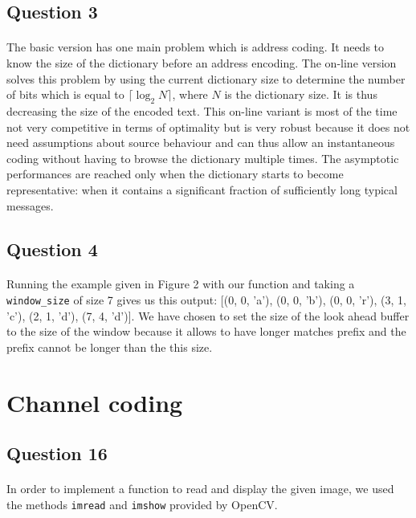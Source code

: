 \documentclass[a4paper, 11pt, oneside]{article}
\begin{document}
\subsection{Question 3}
\paragraph{}The basic version has one main problem which is address coding. It needs to know the
size of the dictionary before an address encoding. The on-line version solves this problem by using the current dictionary size to determine the number of bits which is equal to $\lceil\log_2{N}\rceil$, where $N$ is the dictionary size. It is thus decreasing the size of the encoded text. This on-line variant is most of the time not very competitive in
terms of optimality but is very robust because it does not need assumptions about source behaviour and can thus allow an instantaneous coding without having to browse the dictionary multiple times. The asymptotic performances are reached only when the dictionary starts to become
representative: when it contains a significant fraction of sufficiently long typical messages.

\subsection{Question 4}
\paragraph{}Running the example given in Figure 2 with our function and taking a \texttt{window\_size} of size 7 gives us this output: [(0, 0, 'a'), (0, 0, 'b'), (0, 0, 'r'), (3, 1, 'c'), (2, 1, 'd'), (7, 4, 'd')]. We have chosen to set the size of the look ahead buffer to the size of the window because it allows to have longer matches prefix and the prefix cannot be longer than the this size.



\section{Channel coding}

\subsection{Question 16}
\paragraph{}In order to implement a function to read and display the given image, we used the methods \texttt{imread} and \texttt{imshow} provided by OpenCV.
\end{document}
